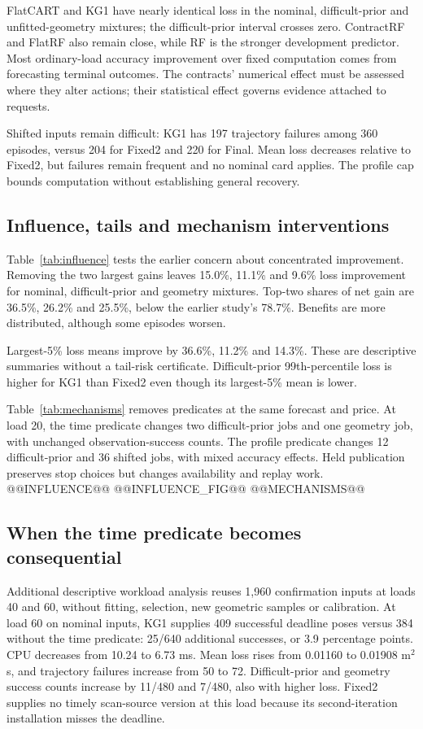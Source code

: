 FlatCART and KG1 have nearly identical loss in the nominal, difficult-prior and unfitted-geometry mixtures; the difficult-prior interval crosses zero. ContractRF and FlatRF also remain close, while RF is the stronger development predictor. Most ordinary-load accuracy improvement over fixed computation comes from forecasting terminal outcomes. The contracts' numerical effect must be assessed where they alter actions; their statistical effect governs evidence attached to requests.

Shifted inputs remain difficult: KG1 has 197 trajectory failures among 360 episodes, versus 204 for Fixed2 and 220 for Final. Mean loss decreases relative to Fixed2, but failures remain frequent and no nominal card applies. The profile cap bounds computation without establishing general recovery.

\subsection{Influence, tails and mechanism interventions}
Table~\ref{tab:influence} tests the earlier concern about concentrated improvement. Removing the two largest gains leaves 15.0\%, 11.1\% and 9.6\% loss improvement for nominal, difficult-prior and geometry mixtures. Top-two shares of net gain are 36.5\%, 26.2\% and 25.5\%, below the earlier study's 78.7\%. Benefits are more distributed, although some episodes worsen.

Largest-5\% loss means improve by 36.6\%, 11.2\% and 14.3\%. These are descriptive summaries without a tail-risk certificate. Difficult-prior 99th-percentile loss is higher for KG1 than Fixed2 even though its largest-5\% mean is lower.

Table~\ref{tab:mechanisms} removes predicates at the same forecast and price. At load 20, the time predicate changes two difficult-prior jobs and one geometry job, with unchanged observation-success counts. The profile predicate changes 12 difficult-prior and 36 shifted jobs, with mixed accuracy effects. Held publication preserves stop choices but changes availability and replay work.
@@INFLUENCE@@
@@INFLUENCE_FIG@@
@@MECHANISMS@@
\subsection{When the time predicate becomes consequential}
Additional descriptive workload analysis reuses 1,960 confirmation inputs at loads 40 and 60, without fitting, selection, new geometric samples or calibration. At load 60 on nominal inputs, KG1 supplies 409 successful deadline poses versus 384 without the time predicate: 25/640 additional successes, or 3.9 percentage points. CPU decreases from 10.24 to 6.73 ms. Mean loss rises from 0.01160 to 0.01908 m$^2$s, and trajectory failures increase from 50 to 72. Difficult-prior and geometry success counts increase by 11/480 and 7/480, also with higher loss. Fixed2 supplies no timely scan-source version at this load because its second-iteration installation misses the deadline.

